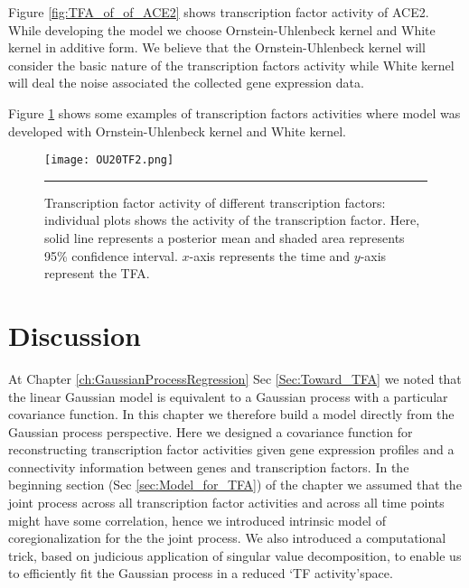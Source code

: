 
Figure \ref{fig:TFA_of_of_ACE2} shows transcription factor activity of ACE2. While developing the model we choose Ornstein-Uhlenbeck kernel and White kernel in additive form. We believe that the Ornstein-Uhlenbeck kernel will consider the basic nature of the transcription factors activity while White kernel will deal the noise associated the collected gene expression data.

Figure \ref{fig:TFA_of_20TF} shows some examples of transcription factors activities where  model was developed with Ornstein-Uhlenbeck kernel and White kernel.

\begin{figure}[t]
	\centering
		\texttt{[image: OU20TF2.png]}
		\rule{35em}{0.5pt}
	\caption[Transcription factor activity of different transcription factor]{Transcription factor activity of different transcription factors: individual plots shows the activity of the transcription factor. Here, solid line represents a posterior mean and shaded area represents 95\% confidence interval. $x$-axis represents the time and $y$-axis represent the TFA.}
	\label{fig:TFA_of_20TF}
\end{figure}




\section{Discussion}
At Chapter \ref{ch:GaussianProcessRegression} Sec \ref{Sec:Toward_TFA} we noted that the linear Gaussian model is equivalent to a Gaussian process with a particular covariance function. In this chapter we therefore build a model directly from the Gaussian process perspective. Here we designed a covariance function for reconstructing transcription factor activities given gene expression profiles and a connectivity information between genes and transcription factors. In the beginning section (Sec \ref{sec:Model_for_TFA}) of the chapter we assumed that the joint process across all transcription factor activities and across all time points might have some correlation, hence we introduced intrinsic model of coregionalization for the the joint process. We also introduced a computational trick, based on  judicious application of singular value decomposition, to enable us to efficiently fit the Gaussian process in a reduced \lq TF activity\rq space. 
